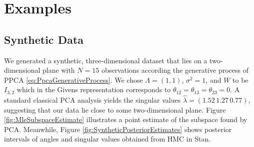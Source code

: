 \documentclass{article}
\begin{document}
\section{Examples}

\subsection{Synthetic Data}
We generated a synthetic, three-dimensional dataset that lies on a two-dimensional plane with $N =15$ observations according the generative process of PPCA \ref{eq:PpcaGenerativeProcess}. We chose $\Lambda = (1, 1)$, $\sigma^2 = 1$, and $W$ to be $I_{3,2}$ which in the Givens representation corresponds to $\theta_{12} = \theta_{13} = \theta_{23} = 0$. A standard classical PCA analysis yields the singular values $\hat{\lambda} = (1.52\, 1.27\, 0.77)$, suggesting that our data lie close to some two-dimensional plane. Figure \ref{fig:MleSubspaceEstimate} illustrates a point estimate of the subspace found by PCA. Meanwhile, Figure \ref{fig:SyntheticPosteriorEstimates} shows posterior intervals of angles and singular values obtained from HMC in Stan.
\end{document}
